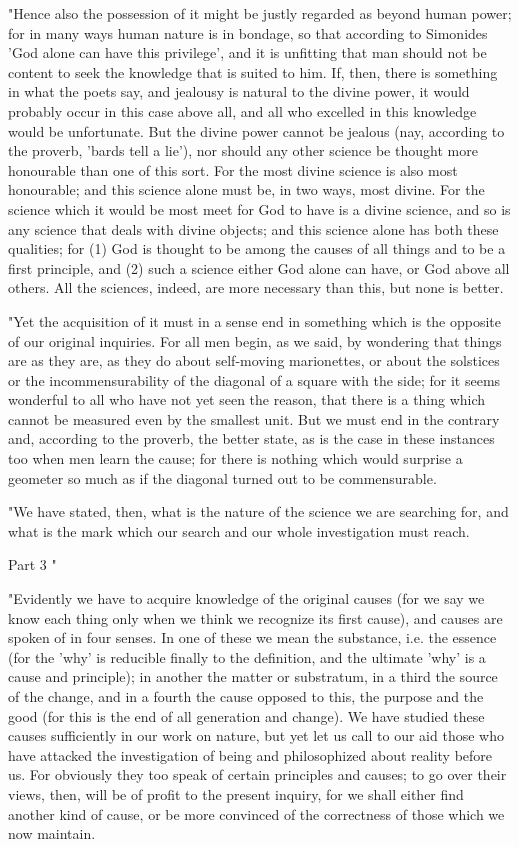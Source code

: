 "Hence also the possession of it might be justly regarded as beyond
human power; for in many ways human nature is in bondage, so that
according to Simonides 'God alone can have this privilege', and it
is unfitting that man should not be content to seek the knowledge
that is suited to him. If, then, there is something in what the poets
say, and jealousy is natural to the divine power, it would probably
occur in this case above all, and all who excelled in this knowledge
would be unfortunate. But the divine power cannot be jealous (nay,
according to the proverb, 'bards tell a lie'), nor should any other
science be thought more honourable than one of this sort. For the
most divine science is also most honourable; and this science alone
must be, in two ways, most divine. For the science which it would
be most meet for God to have is a divine science, and so is any science
that deals with divine objects; and this science alone has both these
qualities; for (1) God is thought to be among the causes of all things
and to be a first principle, and (2) such a science either God alone
can have, or God above all others. All the sciences, indeed, are more
necessary than this, but none is better. 

"Yet the acquisition of it must in a sense end in something which
is the opposite of our original inquiries. For all men begin, as we
said, by wondering that things are as they are, as they do about self-moving
marionettes, or about the solstices or the incommensurability of the
diagonal of a square with the side; for it seems wonderful to all
who have not yet seen the reason, that there is a thing which cannot
be measured even by the smallest unit. But we must end in the contrary
and, according to the proverb, the better state, as is the case in
these instances too when men learn the cause; for there is nothing
which would surprise a geometer so much as if the diagonal turned
out to be commensurable. 

"We have stated, then, what is the nature of the science we are searching
for, and what is the mark which our search and our whole investigation
must reach. 

Part 3 "

"Evidently we have to acquire knowledge of the original causes (for
we say we know each thing only when we think we recognize its first
cause), and causes are spoken of in four senses. In one of these we
mean the substance, i.e. the essence (for the 'why' is reducible finally
to the definition, and the ultimate 'why' is a cause and principle);
in another the matter or substratum, in a third the source of the
change, and in a fourth the cause opposed to this, the purpose and
the good (for this is the end of all generation and change). We have
studied these causes sufficiently in our work on nature, but yet let
us call to our aid those who have attacked the investigation of being
and philosophized about reality before us. For obviously they too
speak of certain principles and causes; to go over their views, then,
will be of profit to the present inquiry, for we shall either find
another kind of cause, or be more convinced of the correctness of
those which we now maintain. 

